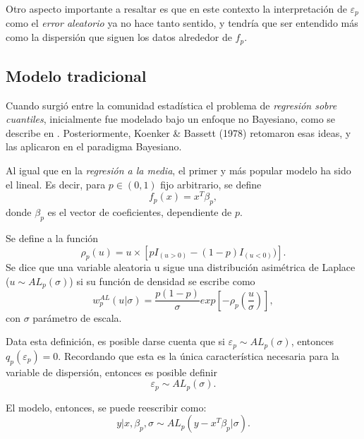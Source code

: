 Otro aspecto importante a resaltar es que en este contexto la interpretaci\'on de $\varepsilon_p$ como el \textit{error aleatorio} ya no hace tanto sentido, y tendr\'ia que ser entendido m\'as como la dispersi\'on que siguen los datos alrededor de $f_p$.

\subsection{Modelo tradicional}

Cuando surgi\'o entre la comunidad estad\'istica el problema de \textit{regresi\'on sobre cuantiles}, inicialmente fue modelado bajo un enfoque no Bayesiano, como se describe en \cite{Yu_BayQuantReg}.  Posteriormente, Koenker \& Bassett (1978) retomaron esas ideas, y las aplicaron en el paradigma Bayesiano. 

Al igual que en la \textit{regresi\'on a la media}, el primer y m\'as popular modelo ha sido el lineal. Es decir, para $p \in (0,1)$ fijo arbitrario, se define
\begin{equation*}
    f_p(x) = x^T\beta_p, 
\end{equation*}
donde $\beta_p$ es el vector de coeficientes, dependiente de $p$.

\begin{defin}
    Se define a la funci\'on
    \begin{equation*}
        \rho_p(u) = u \times [pI_{(u>0)} - (1-p) I_{(u<0)})].
    \end{equation*}
    Se dice que una variable aleatoria u sigue una distribuci\'on asim\'etrica de Laplace ($u \sim AL_p(\sigma)$) si su funci\'on de densidad se escribe como
    \begin{equation*}
        w_p^{AL}(u|\sigma) = 
        \frac{p(1-p)}{\sigma}
        exp\left[
        -\rho_p
        \left(
        \frac{u}{\sigma}
        \right)
        \right],
    \end{equation*}
con $\sigma$ par\'ametro de escala.
\end{defin}

Data esta definici\'on, es posible darse cuenta que si $\varepsilon_p \sim AL_p(\sigma)$, entonces $q_p(\varepsilon_p) = 0$. Recordando que esta es la \'unica caracter\'istica necesaria para la variable de dispersi\'on, entonces es posible definir
\begin{equation*}
    \varepsilon_p \sim AL_p(\sigma).
\end{equation*}

El modelo, entonces, se puede reescribir como:
\begin{equation*}
    y | x, \beta_p, \sigma 
    \sim 
    AL_p(y - x^T\beta_p|\sigma).
\end{equation*}

